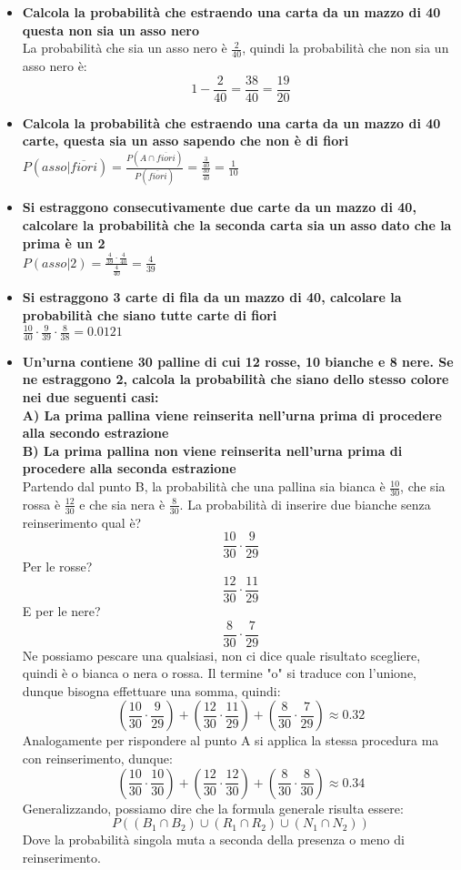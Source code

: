 \documentclass[11pt]{report}
\begin{document}
\begin{itemize}
	\item \textbf{Calcola la probabilità che estraendo una carta da un mazzo di 40 questa non sia un asso nero}\\
	La probabilità che sia un asso nero è $\frac{2}{40}$, quindi la probabilità che non sia un asso nero è:
	$$1 - \frac{2}{40} = \frac{38}{40} = \frac{19}{20}$$
	\item \textbf{Calcola la probabilità che estraendo una carta da un mazzo di 40 carte, questa sia un asso sapendo che non è di fiori}\\
	$P(asso|\overline{fiori}) = \frac{P(A \cap \overline{fiori})}{P(\overline{fiori})} = \frac{\frac{3}{40}}{\frac{30}{40}} = \frac{1}{10}$
	\item \textbf{Si estraggono consecutivamente due carte da un mazzo di 40, calcolare la probabilità che la seconda carta sia un asso dato che la prima è un 2}\\
	$P(asso | 2) = \frac{\frac{4}{39} \cdot \frac{4}{40}}{\frac{4}{40}} = \frac{4}{39}$
	\item \textbf{Si estraggono 3 carte di fila da un mazzo di 40, calcolare la probabilità che siano tutte carte di fiori}\\
	$\frac{10}{40} \cdot \frac{9}{39} \cdot \frac{8}{38} = 0.0121$
	\item \textbf{Un'urna contiene 30 palline di cui 12 rosse, 10 bianche e 8 nere. Se ne estraggono 2, calcola la probabilità che siano dello stesso colore nei due seguenti casi:\\
	A) La prima pallina viene reinserita nell'urna prima di procedere alla secondo estrazione\\
	B) La prima pallina non viene reinserita nell'urna prima di procedere alla seconda estrazione}\\
	Partendo dal punto B, la probabilità che una pallina sia bianca è $\frac{10}{30}$, che sia rossa è $\frac{12}{30}$ e che sia nera è $\frac{8}{30}$. La probabilità di inserire due bianche senza reinserimento qual è?
	$$\frac{10}{30} \cdot \frac{9}{29}$$
	Per le rosse?
	$$\frac{12}{30} \cdot \frac{11}{29}$$
	E per le nere?
	$$\frac{8}{30} \cdot \frac{7}{29}$$
	Ne possiamo pescare una qualsiasi, non ci dice quale risultato scegliere, quindi è o bianca o nera o rossa. Il termine "o" si traduce con l'unione, dunque bisogna effettuare una somma, quindi:
	$$\left( \frac{10}{30} \cdot \frac{9}{29} \right) + \left( \frac{12}{30} \cdot \frac{11}{29} \right) + \left( \frac{8}{30} \cdot \frac{7}{29} \right) \approx 0.32$$
	Analogamente per rispondere al punto A si applica la stessa procedura ma con reinserimento, dunque:
	$$\left( \frac{10}{30} \cdot \frac{10}{30} \right) + \left( \frac{12}{30} \cdot \frac{12}{30} \right) + \left( \frac{8}{30} \cdot \frac{8}{30} \right) \approx 0.34$$
	Generalizzando, possiamo dire che la formula generale risulta essere:
	$$P( (B_1 \cap B_2) \cup (R_1 \cap R_2) \cup (N_1 \cap N_2) )$$
	Dove la probabilità singola muta a seconda della presenza o meno di reinserimento.
\end{itemize}
\end{document}
